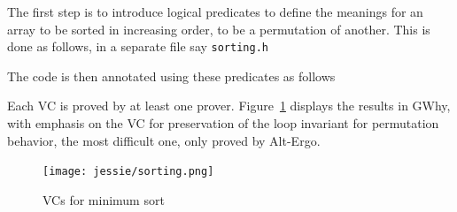 \documentclass[a4paper,11pt,twoside,openright]{report}
\newcommand{\negtenthspace}{\hspace*{-0.1\linewidth}}
\begin{document}
The first step is to introduce logical predicates to define the
meanings for an array to be sorted in increasing order, to be a
permutation of another. This is done as follows, in a separate file
say \texttt{sorting.h}



The code is then annotated using these predicates as follows



Each VC is proved by at least one prover. Figure~\ref{fig:sorting}
displays the results in GWhy, with emphasis on the VC for preservation
of the loop invariant for permutation behavior, the most
difficult one, only proved by Alt-Ergo.

\begin{figure}[t]
  \begin{center}
    \negtenthspace\texttt{[image: jessie/sorting.png]}
  \end{center}
  \caption{VCs for minimum sort}
  \label{fig:sorting}
  \hrulefill
\end{figure}






% 
\end{document}
